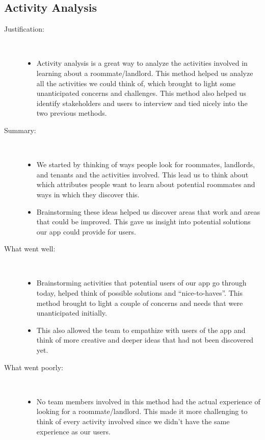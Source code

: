 \documentclass{article}
\begin{document}
\subsection{Activity Analysis}
\begin{description}
    \item[Justification:]
    \newline \,
    \begin{itemize}
        \item Activity analysis is a great way to analyze the activities involved in learning about a 
        roommate/landlord. This method helped us analyze all the activities we could think of, which 
        brought to light some unanticipated concerns and challenges. This method also helped us 
        identify stakeholders and users to interview and tied nicely into the two previous methods.
    \end{itemize}
    
    \item[Summary:]
    \newline \,
    \begin{itemize}
        \item We started by thinking of ways people look for roommates, landlords, and tenants and the 
        activities involved. This lead us to think about which attributes people want to learn about 
        potential roommates and ways in which they discover this.
        \item Brainstorming these ideas helped us discover areas that work and areas that could be 
        improved. This gave us insight into potential solutions our app could provide for users.
    \end{itemize}
    
    \item[What went well:]
    \newline \,
    \begin{itemize}
        \item Brainstorming activities that potential users of our app go through today, helped think 
        of possible solutions and “nice-to-haves”. This method brought to light a couple of concerns 
        and needs that were unanticipated initially.
        \item This also allowed the team to empathize with users of the app and think of more creative 
        and deeper ideas that had not been discovered yet.    
    \end{itemize}
    
    \item[What went poorly:]
    \newline \,
    \begin{itemize}
        \item No team members involved in this method had the actual experience of looking for a 
        roommate/landlord. This made it more challenging to think of every activity involved since we 
        didn't have the same experience as our users.
    \end{itemize}
    

\end{description}
\end{document}

